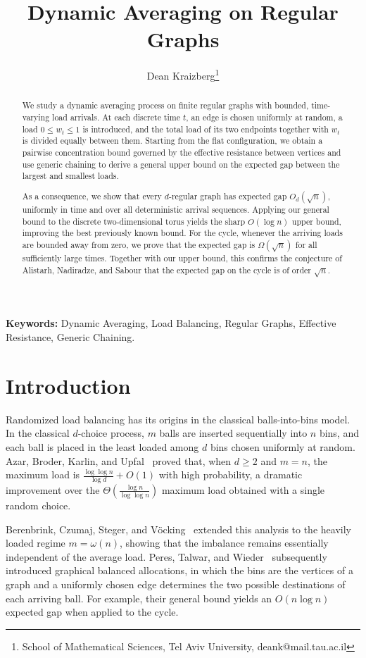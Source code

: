\documentclass[11pt]{article}
\title{Dynamic Averaging on Regular Graphs}
\author{Dean Kraizberg\thanks{School of Mathematical Sciences, Tel Aviv University, deank@mail.tau.ac.il}}
\numberwithin{equation}{section}
\newcommand{\1}{\mathbf{1}}
\begin{document}
\maketitle

\begin{abstract}
We study a dynamic averaging process on finite regular graphs with bounded, time-varying load arrivals. At each discrete time $t$, an edge is chosen uniformly at random, a load $0\le w_t \le 1$ is introduced, and the total load of its two endpoints together with $w_t$ is divided equally between them. Starting from the flat configuration, we obtain a pairwise concentration bound governed by the effective resistance between vertices and use generic chaining to derive a general upper bound on the expected gap between the largest and smallest loads.

As a consequence, we show that every $d$-regular graph has expected gap $O_d(\sqrt n)$, uniformly in time and over all deterministic arrival sequences. Applying our general bound to the discrete two-dimensional torus yields the sharp $O(\log n)$ upper bound, improving the best previously known bound. For the cycle, whenever the arriving loads are bounded away from zero, we prove that the expected gap is $\Omega(\sqrt n)$ for all sufficiently large times. Together with our upper bound, this confirms the conjecture of Alistarh, Nadiradze, and Sabour that the expected gap on the cycle is of order $\sqrt n$.
\end{abstract}
\noindent\textbf{Keywords:} Dynamic Averaging, Load Balancing, Regular Graphs, Effective Resistance, Generic Chaining. 

\section{Introduction}
Randomized load balancing has its origins in the classical balls-into-bins model. In the classical \(d\)-choice process, \(m\) balls are inserted sequentially into \(n\) bins, and each ball is placed in the least loaded among \(d\) bins chosen uniformly at random. Azar, Broder, Karlin, and Upfal~\cite{AzarBroderKarlinUpfal} proved that, when \(d\ge2\) and \(m=n\), the maximum load is \(\frac{\log\log n}{\log d}+O(1)\) with high probability, a dramatic improvement over the \(\Theta(\frac{\log n}{\log\log n})\) maximum load obtained with a single random choice.

\medskip

Berenbrink, Czumaj, Steger, and V\"ocking~\cite{BerenbrinkCzumajStegerVocking} extended this analysis to the heavily loaded regime \(m=\omega(n)\), showing that the imbalance remains essentially independent of the average load. Peres, Talwar, and Wieder~\cite{PeresTalwarWieder} subsequently introduced graphical balanced allocations, in which the bins are the vertices of a graph and a uniformly chosen edge determines the two possible destinations of each arriving ball. For example, their general bound yields an
\(O(n\log n)\) expected gap when applied to the cycle.
\end{document}
